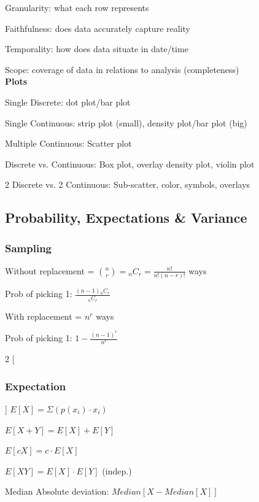 \documentclass[8pt]{extarticle}
\begin{document}
Granularity: what each row represents\par
Faithfulness: does data accurately capture reality\par
Temporality: how does data situate in date/time\par
Scope: coverage of data in relations to analysis (completeness) \\


\textbf{Plots}

Single Discrete: dot plot/bar plot\par
Single Continuous: strip plot (small), density plot/bar plot (big) \par
Multiple Continuous: Scatter plot\par
Discrete vs. Continuous: Box plot, overlay density plot, violin plot\par
2 Discrete vs. 2 Continuous: Sub-scatter, color, symbols, overlays\\

\hline

\subsection*{Probability, Expectations \& Variance}
\subsubsection*{Sampling}
Without replacement = ${n \choose r} = {_nC_r} = \frac{n!}{n!(n-r)!}$ ways\par
Prob of picking 1: $\frac{(n-1) {_nC_r}}{{_nC_r}}$ \par
With replacement = $n^r$ ways \par
Prob of picking 1: $1-\frac{(n-1)^r}{n^r}$ \par

\begin{multicols}{2}
[
\subsubsection*{Expectation}
]
$E[X]=\Sigma {(p(x_i)\cdot x_i)}$\par
$E[X+Y] = E[X] + E[Y]$\par
$E[cX] = c\cdot E[X]$\par
$E[XY] = E[X]\cdot E[Y]$ (indep.)\par
Median Absolute deviation: $Median[X-Median[X]]$\par
\end{multicols}
\end{document}
